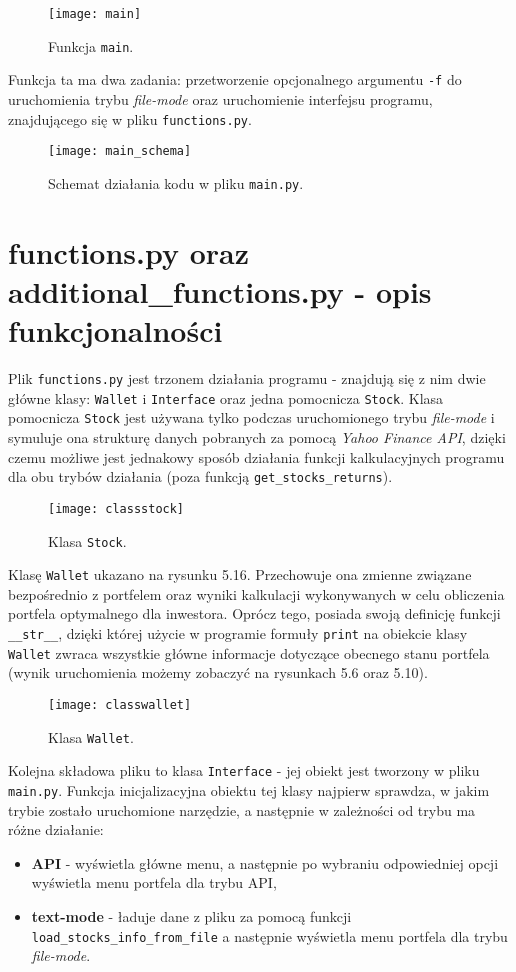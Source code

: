 \documentclass[magister]{dyplom}
\def\code#1{\texttt{#1}}
\begin{document}
\begin{figure}[ht]
	\centering
	\texttt{[image: main]}
	\caption{Funkcja \code{main}.}
\end{figure}

Funkcja ta ma dwa zadania: przetworzenie opcjonalnego argumentu \code{-f} do uruchomienia trybu \textit{file-mode} oraz uruchomienie interfejsu programu, znajdującego się w pliku \code{functions.py}.\\

\begin{figure}[ht]
	\centering
	\texttt{[image: main\_schema]}
	\caption{Schemat działania kodu w pliku \code{main.py}.}
\end{figure}

\section{functions.py oraz additional\_functions.py - opis funkcjonalności}

Plik \code{functions.py} jest trzonem działania programu - znajdują się z nim dwie główne klasy: \code{Wallet} i \code{Interface} oraz jedna pomocnicza \code{Stock}.
Klasa pomocnicza \code{Stock} jest używana tylko podczas uruchomionego trybu \textit{file-mode} i symuluje ona strukturę danych pobranych za pomocą \textit{Yahoo Finance API}, dzięki czemu możliwe jest jednakowy sposób działania funkcji kalkulacyjnych programu dla obu trybów działania (poza funkcją \code{get\_stocks\_returns}).
\begin{figure}[ht]
	\centering
	\texttt{[image: classstock]}
	\caption{Klasa \code{Stock}.}
\end{figure}

Klasę \code{Wallet} ukazano na rysunku 5.16. Przechowuje ona zmienne związane bezpośrednio z portfelem oraz wyniki kalkulacji wykonywanych w celu obliczenia portfela optymalnego dla inwestora. Oprócz tego, posiada swoją definicję funkcji \code{\_\_str\_\_}, dzięki której użycie w programie formuły \code{print} na obiekcie klasy \code{Wallet} zwraca wszystkie główne informacje dotyczące obecnego stanu portfela (wynik uruchomienia możemy zobaczyć na rysunkach 5.6 oraz 5.10).

\begin{figure}[ht]
	\centering
	\texttt{[image: classwallet]}
	\caption{Klasa \code{Wallet}.}
\end{figure}

Kolejna składowa pliku to klasa \code{Interface} - jej obiekt jest tworzony w pliku \code{main.py}. Funkcja inicjalizacyjna obiektu tej klasy najpierw sprawdza, w jakim trybie zostało uruchomione narzędzie, a następnie w zależności od trybu ma różne działanie:
\begin{itemize}
	\item \textbf{API} - wyświetla główne menu, a następnie po wybraniu odpowiedniej opcji wyświetla menu portfela dla trybu API,
	\item \textbf{text-mode} - ładuje dane z pliku za pomocą funkcji \code{load\_stocks\_info\_from\_file} a następnie wyświetla menu portfela dla trybu \textit{file-mode}.
\end{itemize}
\end{document}
